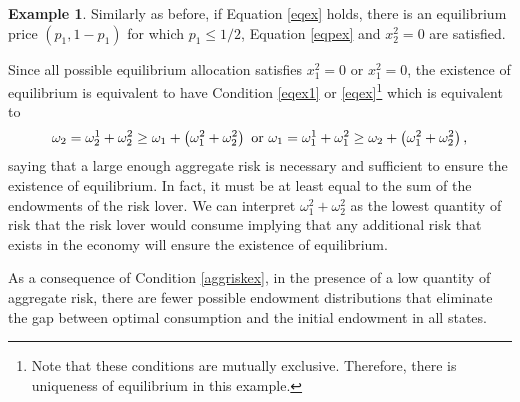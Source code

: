 \documentclass[pdftex]{article}
\numberwithin{equation}{section}
\theoremstyle{th}
\newtheorem{proof lemma}{{Proof Lemma}.}
\theoremstyle{definition}
\newtheorem{example}{Example}%
\begin{document}
\begin{example}
Similarly as before, if Equation \ref{eqex} holds, there is an equilibrium price $(p_1,1-p_1)$ for which $p_1\leq1/2$, Equation \ref{eqpex} and $x^2_2=0$ are satisfied.



Since all possible equilibrium allocation satisfies $x^2_1=0$ or $x^2_1=0$, the existence of equilibrium is equivalent to have Condition \ref{eqex1} or \ref{eqex}\footnote{Note that these conditions are mutually exclusive. Therefore, there is uniqueness of equilibrium in this example.} which is equivalent to \begin{equation}\label{aggriskex}\omega_2=\omega^1_2+\omega^2_2\geq\omega_1+\left(\omega^2_1+\omega^2_2\right)\textnormal{ or }\omega_1=\omega^1_1+\omega^2_1\geq\omega_2+\left(\omega^2_1+\omega^2_2\right),\end{equation}
saying that a large enough aggregate risk is necessary and sufficient to ensure the existence of equilibrium. In fact, it must be at least equal to the sum of the endowments of the risk lover. We can interpret $\omega^2_1+\omega^2_2$ as the lowest quantity of risk that the risk lover would consume implying that any additional risk that exists in the economy will ensure the existence of equilibrium.

As a consequence of Condition \ref{aggriskex}, in the presence of a low quantity of aggregate risk, there are fewer possible endowment distributions that eliminate the gap between optimal consumption and the initial endowment in all states.



\end{example}
\end{document}
